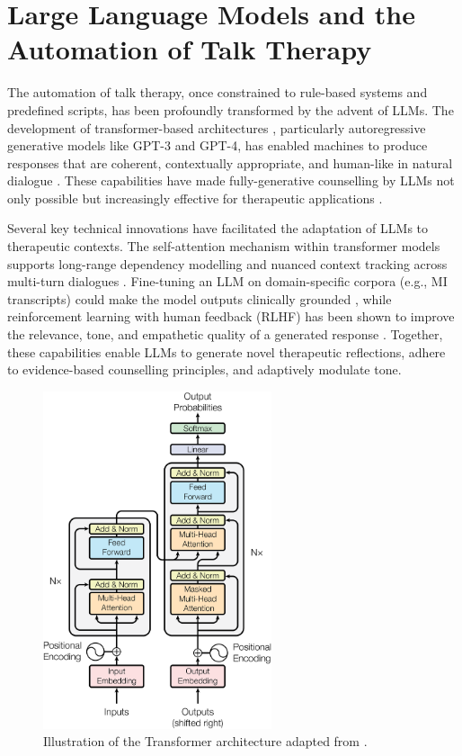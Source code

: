 \section{Large Language Models and the Automation of Talk Therapy}
The automation of talk therapy, once constrained to rule-based systems and predefined scripts, has been profoundly transformed by the advent of LLMs. The development of transformer-based architectures \cite{vaswani2017attention}, particularly autoregressive generative models like GPT-3 and GPT-4, has enabled machines to produce responses that are coherent, contextually appropriate, and human-like in natural dialogue \cite{openai2023gpt4}. These capabilities have made fully-generative counselling by LLMs not only possible but increasingly effective for therapeutic applications \cite{miner2020artificial, torous2023generative}.

Several key technical innovations have facilitated the adaptation of LLMs to therapeutic contexts. The self-attention mechanism within transformer models supports long-range dependency modelling and nuanced context tracking across multi-turn dialogues \cite{vaswani2017attention}. Fine-tuning an LLM on domain-specific corpora (e.g., MI transcripts) could make the model outputs clinically grounded \cite{valentino2024evaluating}, while reinforcement learning with human feedback (RLHF) has been shown to improve the relevance, tone, and empathetic quality of a generated response \cite{10.5555/3600270.3602281, gilson2023empathy}. Together, these capabilities enable LLMs to generate novel therapeutic reflections, adhere to evidence-based counselling principles, and adaptively modulate tone.



\begin{figure}[ht]
    \centering
    \includegraphics[width=0.6\textwidth]{fig/transformer_architecture.png}
    \caption{Illustration of the Transformer architecture adapted from \citet{vaswani2017attention}.}
    \label{fig:transformer}
\end{figure}


